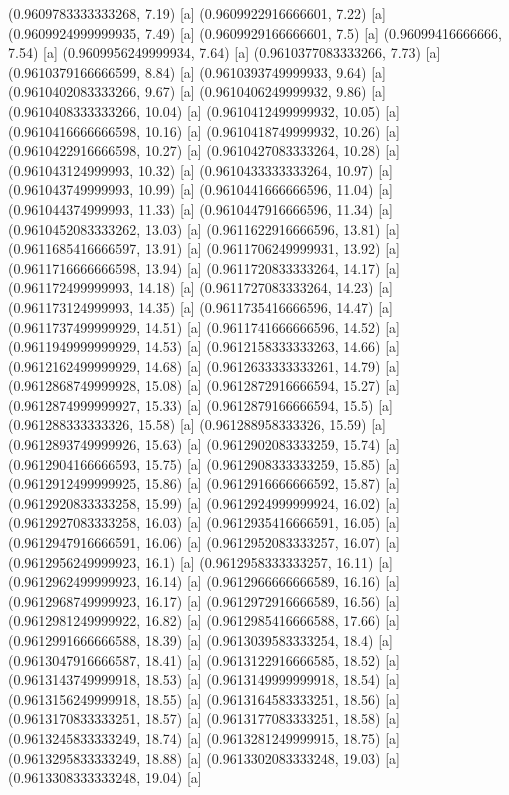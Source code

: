 {{{(0.9609783333333268, 7.19) [a] 
(0.9609922916666601, 7.22) [a] 
(0.9609924999999935, 7.49) [a] 
(0.9609929166666601, 7.5) [a] 
(0.96099416666666, 7.54) [a] 
(0.9609956249999934, 7.64) [a] 
(0.9610377083333266, 7.73) [a] 
(0.9610379166666599, 8.84) [a] 
(0.9610393749999933, 9.64) [a] 
(0.9610402083333266, 9.67) [a] 
(0.9610406249999932, 9.86) [a] 
(0.9610408333333266, 10.04) [a] 
(0.9610412499999932, 10.05) [a] 
(0.9610416666666598, 10.16) [a] 
(0.9610418749999932, 10.26) [a] 
(0.9610422916666598, 10.27) [a] 
(0.9610427083333264, 10.28) [a] 
(0.961043124999993, 10.32) [a] 
(0.9610433333333264, 10.97) [a] 
(0.961043749999993, 10.99) [a] 
(0.9610441666666596, 11.04) [a] 
(0.961044374999993, 11.33) [a] 
(0.9610447916666596, 11.34) [a] 
(0.9610452083333262, 13.03) [a] 
(0.9611622916666596, 13.81) [a] 
(0.9611685416666597, 13.91) [a] 
(0.9611706249999931, 13.92) [a] 
(0.9611716666666598, 13.94) [a] 
(0.9611720833333264, 14.17) [a] 
(0.961172499999993, 14.18) [a] 
(0.9611727083333264, 14.23) [a] 
(0.961173124999993, 14.35) [a] 
(0.9611735416666596, 14.47) [a] 
(0.9611737499999929, 14.51) [a] 
(0.9611741666666596, 14.52) [a] 
(0.9611949999999929, 14.53) [a] 
(0.9612158333333263, 14.66) [a] 
(0.9612162499999929, 14.68) [a] 
(0.9612633333333261, 14.79) [a] 
(0.9612868749999928, 15.08) [a] 
(0.9612872916666594, 15.27) [a] 
(0.9612874999999927, 15.33) [a] 
(0.9612879166666594, 15.5) [a] 
(0.961288333333326, 15.58) [a] 
(0.961288958333326, 15.59) [a] 
(0.9612893749999926, 15.63) [a] 
(0.9612902083333259, 15.74) [a] 
(0.9612904166666593, 15.75) [a] 
(0.9612908333333259, 15.85) [a] 
(0.9612912499999925, 15.86) [a] 
(0.9612916666666592, 15.87) [a] 
(0.9612920833333258, 15.99) [a] 
(0.9612924999999924, 16.02) [a] 
(0.9612927083333258, 16.03) [a] 
(0.9612935416666591, 16.05) [a] 
(0.9612947916666591, 16.06) [a] 
(0.9612952083333257, 16.07) [a] 
(0.9612956249999923, 16.1) [a] 
(0.9612958333333257, 16.11) [a] 
(0.9612962499999923, 16.14) [a] 
(0.9612966666666589, 16.16) [a] 
(0.9612968749999923, 16.17) [a] 
(0.9612972916666589, 16.56) [a] 
(0.9612981249999922, 16.82) [a] 
(0.9612985416666588, 17.66) [a] 
(0.9612991666666588, 18.39) [a] 
(0.9613039583333254, 18.4) [a] 
(0.9613047916666587, 18.41) [a] 
(0.9613122916666585, 18.52) [a] 
(0.9613143749999918, 18.53) [a] 
(0.9613149999999918, 18.54) [a] 
(0.9613156249999918, 18.55) [a] 
(0.9613164583333251, 18.56) [a] 
(0.9613170833333251, 18.57) [a] 
(0.9613177083333251, 18.58) [a] 
(0.9613245833333249, 18.74) [a] 
(0.9613281249999915, 18.75) [a] 
(0.9613295833333249, 18.88) [a] 
(0.9613302083333248, 19.03) [a] 
(0.9613308333333248, 19.04) [a] 
}}}
